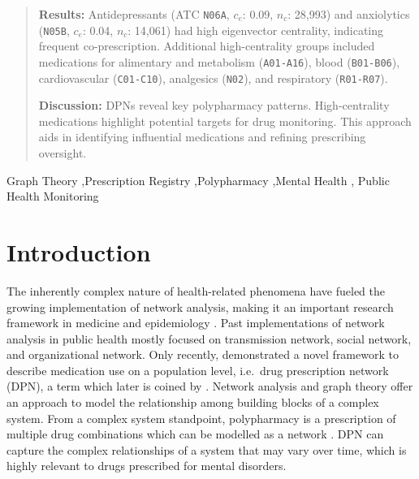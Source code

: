 \documentclass[
  authoryear,
  review]{elsarticle}
\begin{document}
\begin{frontmatter}
\begin{abstract}
\textbf{Results:} Antidepressants (ATC \texttt{N06A}, \(c_e\): 0.09,
\(n_c\): 28,993) and anxiolytics (\texttt{N05B}, \(c_e\): 0.04, \(n_c\):
14,061) had high eigenvector centrality, indicating frequent
co-prescription. Additional high-centrality groups included medications
for alimentary and metabolism (\texttt{A01-A16}), blood
(\texttt{B01-B06}), cardiovascular (\texttt{C01-C10}), analgesics
(\texttt{N02}), and respiratory (\texttt{R01-R07}).

\textbf{Discussion:} DPNs reveal key polypharmacy patterns.
High-centrality medications highlight potential targets for drug
monitoring. This approach aids in identifying influential medications
and refining prescribing oversight.
\end{abstract}





\begin{keyword}
    Graph Theory \sep Prescription
Registry \sep Polypharmacy \sep Mental Health \sep 
    Public Health Monitoring
\end{keyword}
\end{frontmatter}
    

\section{Introduction}\label{introduction}

The inherently complex nature of health-related phenomena have fueled
the growing implementation of network analysis, making it an important
research framework in medicine and epidemiology \citep{Luke2007}. Past
implementations of network analysis in public health mostly focused on
transmission network, social network, and organizational network. Only
recently, \citet{Cavallo2012} demonstrated a novel framework to describe
medication use on a population level, i.e.~drug prescription network
(DPN), a term which later is coined by \citet{Bazzoni2015}. Network
analysis and graph theory offer an approach to model the relationship
among building blocks of a complex system. From a complex system
standpoint, polypharmacy is a prescription of multiple drug combinations
which can be modelled as a network \citep{Miglio2021}. DPN can capture
the complex relationships of a system that may vary over time, which is
highly relevant to drugs prescribed for mental disorders.
\end{document}
